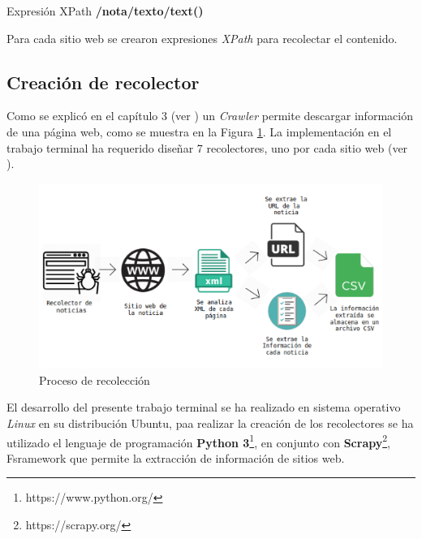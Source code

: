 \begin{mygraybox}[label={box:xpathEjemplo}]{Expresión XPath} 
\textbf{/nota/texto/text()}
\end{mygraybox}

Para cada sitio web se crearon expresiones \textit{XPath} para recolectar el contenido.

\subsection{Creación de recolector}

Como se explicó en el capítulo 3 (ver ) un \textit{Crawler} permite descargar información de una página web, como se muestra en la Figura \ref{Fig:recoleccion}. La implementación en el trabajo terminal ha requerido diseñar 7 recolectores, uno por cada sitio web (ver ). \\

\begin{figure}[H]
	\centering
	\includegraphics[scale=.3]{imagenes/Capitulo5/recoleccion.png}
	\caption{Proceso de recolección}
	\label{Fig:recoleccion}
\end{figure}

El desarrollo del presente trabajo terminal se ha realizado en sistema operativo \textit{Linux} en su distribución Ubuntu, paa realizar la creación de los recolectores se ha utilizado el lenguaje de programación \textbf{Python 3}\footnote{https://www.python.org/}, en conjunto con \textbf{Scrapy}\footnote{https://scrapy.org/}, Fsramework que permite la extracción de información de sitios web. 

